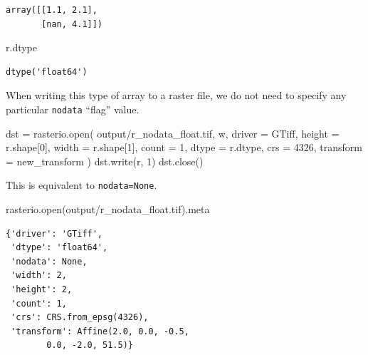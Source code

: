 \documentclass[
  letterpaper,
]{krantz}
\newenvironment{Shaded}{\begin{snugshade}}{\end{snugshade}}
\newcommand{\BuiltInTok}[1]{\textcolor[rgb]{0.00,0.23,0.31}{#1}}
\newcommand{\DecValTok}[1]{\textcolor[rgb]{0.68,0.00,0.00}{#1}}
\newcommand{\NormalTok}[1]{\textcolor[rgb]{0.00,0.23,0.31}{#1}}
\newcommand{\OperatorTok}[1]{\textcolor[rgb]{0.37,0.37,0.37}{#1}}
\newcommand{\StringTok}[1]{\textcolor[rgb]{0.13,0.47,0.30}{#1}}
\begin{document}
\begin{verbatim}
array([[1.1, 2.1],
       [nan, 4.1]])
\end{verbatim}

\begin{Shaded}
\begin{Highlighting}[]
\NormalTok{r.dtype}
\end{Highlighting}
\end{Shaded}

\begin{verbatim}
dtype('float64')
\end{verbatim}

When writing this type of array to a raster file, we do not need to
specify any particular \texttt{nodata} ``flag'' value.

\begin{Shaded}
\begin{Highlighting}[]
\NormalTok{dst }\OperatorTok{=}\NormalTok{ rasterio.}\BuiltInTok{open}\NormalTok{(}
    \StringTok{\textquotesingle{}output/r\_nodata\_float.tif\textquotesingle{}}\NormalTok{, }\StringTok{\textquotesingle{}w\textquotesingle{}}\NormalTok{, }
\NormalTok{    driver }\OperatorTok{=} \StringTok{\textquotesingle{}GTiff\textquotesingle{}}\NormalTok{,}
\NormalTok{    height }\OperatorTok{=}\NormalTok{ r.shape[}\DecValTok{0}\NormalTok{],}
\NormalTok{    width }\OperatorTok{=}\NormalTok{ r.shape[}\DecValTok{1}\NormalTok{],}
\NormalTok{    count }\OperatorTok{=} \DecValTok{1}\NormalTok{,}
\NormalTok{    dtype }\OperatorTok{=}\NormalTok{ r.dtype,}
\NormalTok{    crs }\OperatorTok{=} \DecValTok{4326}\NormalTok{,}
\NormalTok{    transform }\OperatorTok{=}\NormalTok{ new\_transform}
\NormalTok{)}
\NormalTok{dst.write(r, }\DecValTok{1}\NormalTok{)}
\NormalTok{dst.close()}
\end{Highlighting}
\end{Shaded}

This is equivalent to \texttt{nodata=None}.

\begin{Shaded}
\begin{Highlighting}[]
\NormalTok{rasterio.}\BuiltInTok{open}\NormalTok{(}\StringTok{\textquotesingle{}output/r\_nodata\_float.tif\textquotesingle{}}\NormalTok{).meta}
\end{Highlighting}
\end{Shaded}

\begin{verbatim}
{'driver': 'GTiff',
 'dtype': 'float64',
 'nodata': None,
 'width': 2,
 'height': 2,
 'count': 1,
 'crs': CRS.from_epsg(4326),
 'transform': Affine(2.0, 0.0, -0.5,
        0.0, -2.0, 51.5)}
\end{verbatim}
\end{document}
